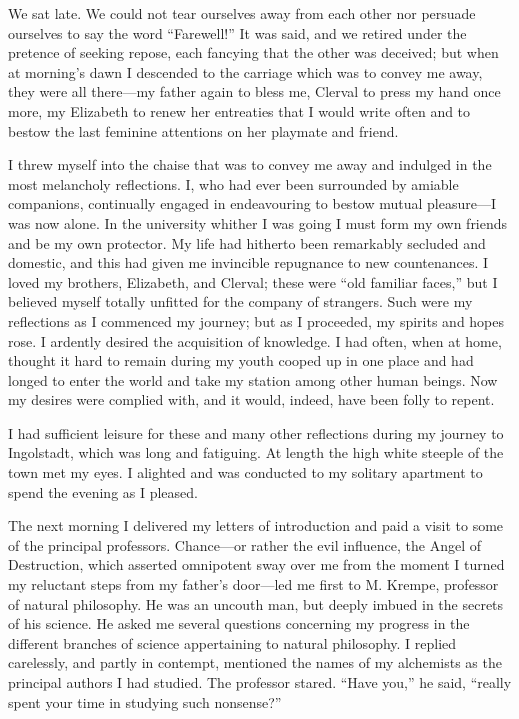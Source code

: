 \documentclass[12pt,openright]{book}
\begin{document}
We sat late. We could not tear ourselves away from each other nor persuade ourselves to say the word “Farewell!” It was said, and we retired under the pretence of seeking repose, each fancying that the other was deceived; but when at morning’s dawn I descended to the carriage which was to convey me away, they were all there—my father again to bless me, Clerval to press my hand once more, my Elizabeth to renew her entreaties that I would write often and to bestow the last feminine attentions on her playmate and friend.

I threw myself into the chaise that was to convey me away and indulged in the most melancholy reflections. I, who had ever been surrounded by amiable companions, continually engaged in endeavouring to bestow mutual pleasure—I was now alone. In the university whither I was going I must form my own friends and be my own protector. My life had hitherto been remarkably secluded and domestic, and this had given me invincible repugnance to new countenances. I loved my brothers, Elizabeth, and Clerval; these were “old familiar faces,” but I believed myself totally unfitted for the company of strangers. Such were my reflections as I commenced my journey; but as I proceeded, my spirits and hopes rose. I ardently desired the acquisition of knowledge. I had often, when at home, thought it hard to remain during my youth cooped up in one place and had longed to enter the world and take my station among other human beings. Now my desires were complied with, and it would, indeed, have been folly to repent.

I had sufficient leisure for these and many other reflections during my journey to Ingolstadt, which was long and fatiguing. At length the high white steeple of the town met my eyes. I alighted and was conducted to my solitary apartment to spend the evening as I pleased.

The next morning I delivered my letters of introduction and paid a visit to some of the principal professors. Chance—or rather the evil influence, the Angel of Destruction, which asserted omnipotent sway over me from the moment I turned my reluctant steps from my father’s door—led me first to M. Krempe, professor of natural philosophy. He was an uncouth man, but deeply imbued in the secrets of his science. He asked me several questions concerning my progress in the different branches of science appertaining to natural philosophy. I replied carelessly, and partly in contempt, mentioned the names of my alchemists as the principal authors I had studied. The professor stared. “Have you,” he said, “really spent your time in studying such nonsense?”
\end{document}
